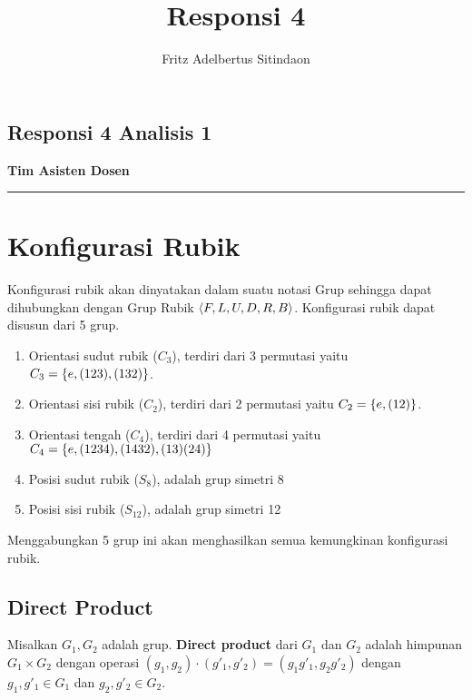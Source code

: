 \documentclass{article}
\title{Responsi 4}
\author{Fritz Adelbertus Sitindaon}
\date{}
\begin{document}
\begin{flushright}
    \section*{Responsi 4 Analisis 1}
    \textbf{Tim Asisten Dosen}
\end{flushright}


\vspace{0.5cm}\hrule height 2pt\vspace{0.5cm}



\section{Konfigurasi Rubik}

Konfigurasi rubik akan dinyatakan dalam suatu notasi Grup sehingga dapat dihubungkan
dengan Grup Rubik $\langle F,L,U,D,R,B\rangle$. Konfigurasi rubik dapat disusun dari 
5 grup.
\begin{enumerate}
    \item Orientasi sudut rubik ($C_3$), terdiri dari 3 permutasi yaitu $C_3=\{e,(123),(132)\}$. 
    \item Orientasi sisi rubik ($C_2$), terdiri dari 2 permutasi yaitu $C_2=\{e,(12)\}$.
    \item Orientasi tengah ($C_4$), terdiri dari 4 permutasi yaitu $C_4=\{e,(1234),(1432),(13)(24)\}$ 
    \item Posisi sudut rubik ($S_8$), adalah grup simetri 8 
    \item Posisi sisi rubik ($S_{12}$), adalah grup simetri 12 
\end{enumerate}
Menggabungkan 5 grup ini akan menghasilkan semua kemungkinan konfigurasi rubik.

\subsection{Direct Product}

\begin{definition}
    Misalkan $G_1, G_2$ adalah grup. \textbf{Direct product} dari $G_1$ dan $G_2$ adalah
    himpunan $G_1\times G_2$ dengan operasi $(g_1,g_2)\cdot(g'_1,g'_2) = (g_1g'_1,g_2g'_2)$ dengan $g_1,g'_1\in G_1$ 
    dan $g_2,g'_2\in G_2$.
\end{definition}
\end{document}
